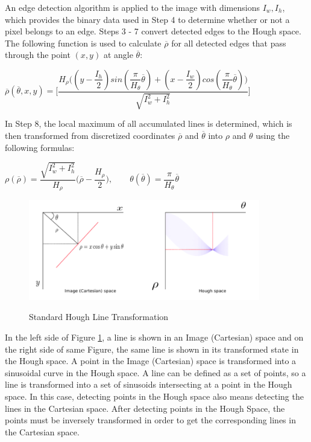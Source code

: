  
An edge detection algorithm is applied to the image with dimensions $I_{w}, I_{h}$, which provides the binary data used in Step 4 to determine whether or not a pixel belongs to an edge. Steps 3 - 7 convert detected edges to the Hough space. The following function is used to calculate $\overline{\rho}$ for all detected edges that pass through the point $(x,y)$ at angle $\overline{\theta}$: 
 
 
 \begin{center}
 
 
$ \overline{\rho}(\overline{\theta},x,y) = \Bigg[\dfrac{H_{\rho}\big((y-\dfrac{I_{h}}{2})sin(\dfrac{\pi}{H_{\theta}}\overline{\theta})+(x-\dfrac{I_{w}}{2})cos(\dfrac{\pi}{H_{\theta}}\overline{\theta})\big)}{\sqrt{I^{2}_{w}+I^{2}_{h}}}\Bigg] $ 
 \end{center}
 
In Step 8, the local maximum of all accumulated lines is determined, which is then transformed from discretized coordinates $\overline{\rho}$ and $\overline{\theta}$ into $\rho$ and $\theta$ using the following formulas:   
  
 \begin{center}

$ \rho(\overline{\rho}) = \dfrac{\sqrt{I^{2}_{w} + I^{2}_{h} }}{H_{\rho}} \bigg(\overline{\rho}-\dfrac{H_{\rho}}{2}\bigg)   ,  \qquad              \theta(\overline{\theta})=\dfrac{\pi}{H_{\theta}}\overline{\theta} $
 
 \end{center}
 
 \begin{figure}[H]
 \centering
  \includegraphics[width=0.9\textwidth]{./Bilder/Standard_Hough_Line_Transformation.png}\label{Standard_Hough_Line_Transformation_fig}
  \caption{Standard Hough Line Transformation\cite{Standard_Hough_Transformation}}
\end{figure}
 
 In the left side of Figure \ref{Standard_Hough_Line_Transformation_fig}, a line is shown in an Image (Cartesian) space and on the right side of same Figure, the same line is shown in its transformed state in the Hough space. A point in the Image (Cartesian) space is transformed into a sinusoidal curve in the Hough space. A line can be defined as a set of points, so a line is transformed into a set of sinusoids intersecting at a point in the Hough space. In this case, detecting points in the Hough space also means detecting the lines in the Cartesian space. After detecting points in the Hough Space, the points must be inversely transformed in order to get the corresponding lines in the Cartesian space.
 

